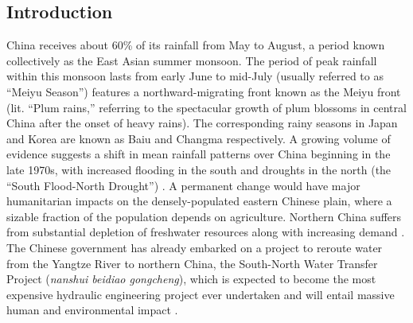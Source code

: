 \documentclass[draft,grl]{AGUTeX}
\begin{document}
\begin{article}




\section{Introduction}
 
 	China receives about 60\% of its rainfall from May to August, a period known collectively as the East Asian summer monsoon. The period of peak rainfall within this monsoon lasts from early June to mid-July (usually referred to as ``Meiyu Season'') features a northward-migrating front known as the Meiyu front (lit. ``Plum rains,'' referring to the spectacular growth of plum blossoms in central China after the onset of heavy rains). The corresponding rainy seasons in Japan and Korea are known as Baiu and Changma respectively. A growing volume of evidence suggests a shift in mean rainfall patterns over China beginning in the late 1970s, with increased flooding in the south and droughts in the north (the ``South Flood-North Drought'') \citep{Hu1997,Gong2002,Nigam2013}. A permanent change would have major humanitarian impacts on the densely-populated eastern Chinese plain, where a sizable fraction of the population depends on agriculture. Northern China suffers from substantial depletion of freshwater resources along with increasing demand \citep{Currell2012,Gleeson2012}. The Chinese government has already embarked on a project to reroute water from the Yangtze River to northern China, the South-North Water Transfer Project (\textit{nanshui beidiao gongcheng}), which is expected to become the most expensive hydraulic engineering project ever undertaken and will entail massive human and environmental impact \citep{Magee2011}.
 

\end{article}
\end{document}
